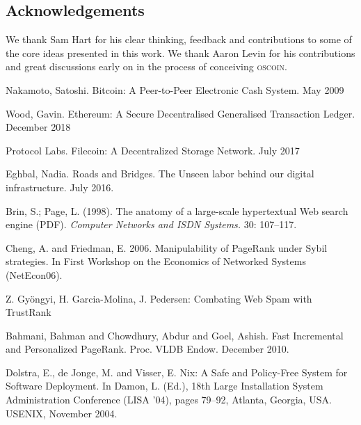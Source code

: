\documentclass[a4paper, oneside, 10pt, final]{amsart}
\def\oscoin{\textsc{\small{oscoin}}}
\begin{document}
\setlength{\columnsep}{1cm}
\begin{multicols}{2}






\pagebreak


\section*{Acknowledgements}
We thank Sam Hart for his clear thinking, feedback and contributions to some of
the core ideas presented in this work. We thank Aaron Levin for his contributions
and great discussions early on in the process of conceiving \oscoin{}.

\begin{thebibliography}{9}

 Nakamoto, Satoshi. Bitcoin: A Peer-to-Peer Electronic Cash
  System. May 2009

 Wood, Gavin. Ethereum: A Secure Decentralised Generalised
  Transaction Ledger. December 2018

 Protocol Labs. Filecoin: A Decentralized Storage Network.
  July 2017

 Eghbal, Nadia. Roads and Bridges. The Unseen labor
  behind our digital infrastructure. July 2016.

 Brin, S.; Page, L. (1998). The anatomy of a
  large-scale hypertextual Web search engine (PDF). \emph{Computer Networks
  and ISDN Systems.} 30: 107–117.

 Cheng, A. and Friedman, E. 2006. Manipulability of
  PageRank under Sybil strategies. In First Workshop on the Economics of
  Networked Systems (NetEcon06).

 Z. Gyöngyi, H. Garcia-Molina, J. Pedersen: Combating Web
  Spam with TrustRank

 Bahmani, Bahman and Chowdhury, Abdur and Goel,
  Ashish. Fast Incremental and Personalized PageRank. Proc. VLDB
  Endow. December 2010.

 Dolstra, E., de Jonge, M. and Visser, E. Nix: A Safe and
  Policy-Free System for Software Deployment. In Damon, L. (Ed.), 18th Large
  Installation System Administration Conference (LISA '04), pages 79–92, Atlanta,
  Georgia, USA. USENIX, November 2004.

\end{thebibliography}

\end{multicols}
\end{document}
